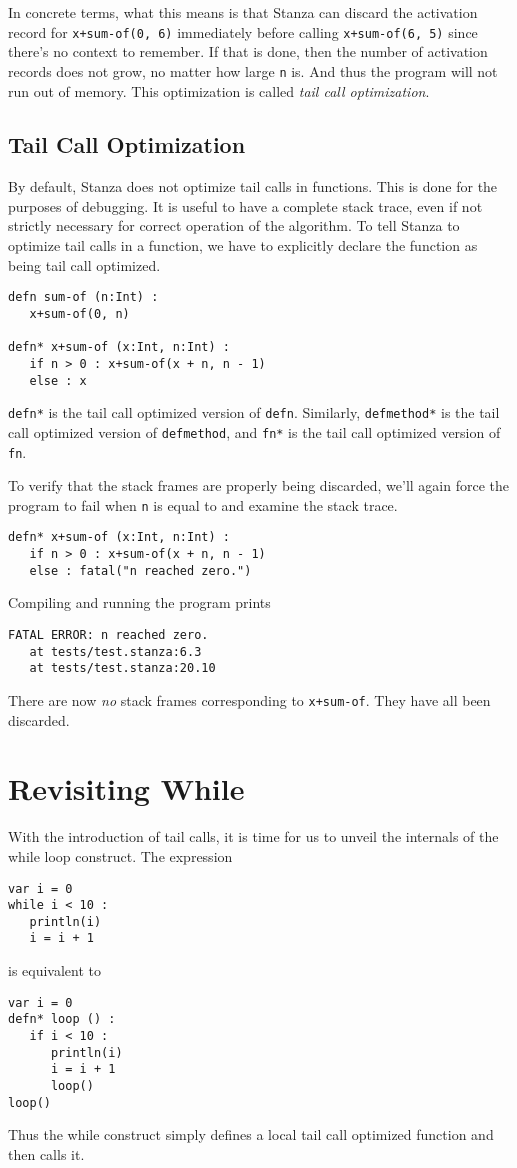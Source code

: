 \documentclass[10pt,oneside]{book}
\begin{document}
In concrete terms, what this means is that Stanza can discard the activation record for \texttt{\frenchspacing x+sum-of(0, 6)} immediately before calling \texttt{\frenchspacing x+sum-of(6, 5)} since there's no context to remember. If that is done, then the number of activation records does not grow, no matter how large \texttt{\frenchspacing n} is. And thus the program will not run out of memory. This optimization is called {\em tail call optimization}.

\subsection*{Tail Call Optimization}
By default, Stanza does not optimize tail calls in functions. This is done for the purposes of debugging. It is useful to have a complete stack trace, even if not strictly necessary for correct operation of the algorithm. To tell Stanza to optimize tail calls in a function, we have to explicitly declare the function as being tail call optimized.
\begin{lstlisting}
defn sum-of (n:Int) :
   x+sum-of(0, n)
   
defn* x+sum-of (x:Int, n:Int) :
   if n > 0 : x+sum-of(x + n, n - 1)
   else : x
\end{lstlisting}
\texttt{\frenchspacing defn*} is the tail call optimized version of \texttt{\frenchspacing defn}. Similarly, \texttt{\frenchspacing defmethod*} is the tail call optimized version of \texttt{\frenchspacing defmethod}, and \texttt{\frenchspacing fn*} is the tail call optimized version of \texttt{\frenchspacing fn}. 

To verify that the stack frames are properly being discarded, we'll again force the program to fail when \texttt{\frenchspacing n} is equal to \texttt{} and examine the stack trace.
\begin{lstlisting}
defn* x+sum-of (x:Int, n:Int) :
   if n > 0 : x+sum-of(x + n, n - 1)
   else : fatal("n reached zero.")
\end{lstlisting}
Compiling and running the program prints
\begin{lstlisting}
FATAL ERROR: n reached zero.
   at tests/test.stanza:6.3
   at tests/test.stanza:20.10
\end{lstlisting}
There are now {\em no} stack frames corresponding to \texttt{\frenchspacing x+sum-of}. They have all been discarded.

\section{Revisiting While}
With the introduction of tail calls, it is time for us to unveil the internals of the while loop construct. The expression
\begin{lstlisting}
var i = 0
while i < 10 :
   println(i)
   i = i + 1
\end{lstlisting}
is equivalent to
\begin{lstlisting}
var i = 0
defn* loop () :
   if i < 10 :
      println(i)
      i = i + 1
      loop()
loop()
\end{lstlisting}
Thus the while construct simply defines a local tail call optimized function and then calls it.
\end{document}
